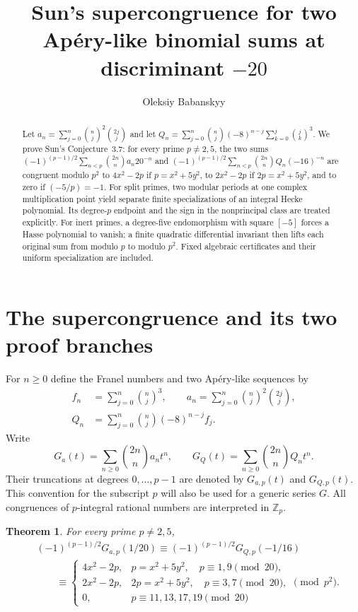 \documentclass[11pt,a4paper]{article}
\title{Sun's supercongruence for two Ap\'ery-like binomial sums at discriminant $-20$}
\author{Oleksiy Babanskyy}
\date{}
\newtheorem{theorem}{Theorem}[section]
\theoremstyle{remark}
\newcommand{\Zp}{\mathbb Z_p}
\begin{document}
\maketitle
\begin{abstract}
Let $a_n=\sum_{j=0}^n\binom nj^2\binom{2j}j$ and let
$Q_n=\sum_{j=0}^n\binom nj(-8)^{n-j}\sum_{k=0}^j\binom jk^3$.
We prove Sun's Conjecture~3.7: for every prime $p\ne2,5$, the two sums
$(-1)^{(p-1)/2}\sum_{n<p}\binom{2n}n a_n20^{-n}$ and
$(-1)^{(p-1)/2}\sum_{n<p}\binom{2n}n Q_n(-16)^{-n}$ are congruent
modulo $p^2$ to $4x^2-2p$ if $p=x^2+5y^2$, to $2x^2-2p$ if
$2p=x^2+5y^2$, and to zero if $(-5/p)=-1$.
For split primes, two modular periods at one complex multiplication
point yield separate finite specializations of an integral Hecke
polynomial. Its degree-$p$ endpoint and the sign in the nonprincipal
class are treated explicitly. For inert primes, a degree-five
endomorphism with square $[-5]$ forces a Hasse polynomial to vanish;
a finite quadratic differential invariant then lifts each original sum
from modulo $p$ to modulo $p^2$. Fixed algebraic certificates and their
uniform specialization are included.
\end{abstract}

\section{The supercongruence and its two proof branches}\label{sec:intro}
For $n\ge0$ define the Franel numbers and two Ap\'ery-like sequences by
\begin{equation}\label{eq:sequences}
\begin{split}
 f_n&=\sum_{j=0}^n\binom nj^3,\qquad
 a_n=\sum_{j=0}^n\binom nj^2\binom{2j}j,\\
 Q_n&=\sum_{j=0}^n\binom nj(-8)^{n-j}f_j.
\end{split}
\end{equation}
Write
\begin{equation}\label{eq:series}
 G_a(t)=\sum_{n\ge0}\binom{2n}n a_nt^n,\qquad
 G_Q(t)=\sum_{n\ge0}\binom{2n}n Q_nt^n.
\end{equation}
Their truncations at degrees $0,\ldots,p-1$ are denoted by
$G_{a,p}(t)$ and $G_{Q,p}(t)$. This convention for the subscript $p$
will also be used for a generic series $G$. All congruences of
$p$-integral rational numbers are interpreted in $\Zp$.

\begin{theorem}\label{thm:main}
For every prime $p\ne2,5$,
\begin{equation}\label{eq:main}
\begin{aligned}
 &(-1)^{(p-1)/2}G_{a,p}(1/20)
 \equiv(-1)^{(p-1)/2}G_{Q,p}(-1/16)\\
 &\qquad\equiv
 \begin{cases}
 4x^2-2p,&p=x^2+5y^2,\quad p\equiv1,9\pmod{20},\\
 2x^2-2p,&2p=x^2+5y^2,\quad p\equiv3,7\pmod{20},\\
 0,&p\equiv11,13,17,19\pmod{20}
 \end{cases}
 \pmod{p^2}.
\end{aligned}
\end{equation}
\end{theorem}
\end{document}
